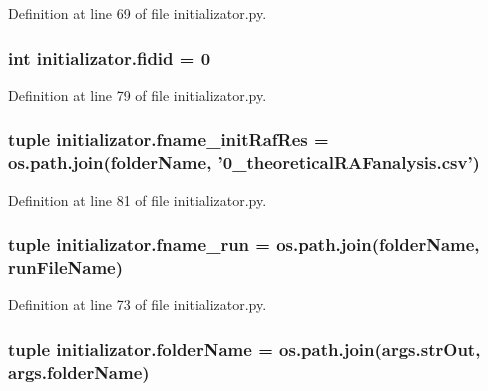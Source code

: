 Definition at line 69 of file initializator.\-py.

\hypertarget{a00135_afdd976dc87dc056c8cba6926f9f98287}{
\subsubsection[{fidid}]{\setlength{\rightskip}{0pt plus 5cm}int initializator.\-fidid = 0}}\label{a00135_afdd976dc87dc056c8cba6926f9f98287}


Definition at line 79 of file initializator.\-py.

\hypertarget{a00135_a139a15a6b4127dd23049cb2b91a85d77}{
\subsubsection[{fname\-\_\-init\-Raf\-Res}]{\setlength{\rightskip}{0pt plus 5cm}tuple initializator.\-fname\-\_\-init\-Raf\-Res = os.\-path.\-join({\bf folder\-Name}, '0\-\_\-theoretical\-R\-A\-Fanalysis.\-csv')}}\label{a00135_a139a15a6b4127dd23049cb2b91a85d77}


Definition at line 81 of file initializator.\-py.

\hypertarget{a00135_a6bc5100ec1c6492cec974172df243857}{
\subsubsection[{fname\-\_\-run}]{\setlength{\rightskip}{0pt plus 5cm}tuple initializator.\-fname\-\_\-run = os.\-path.\-join({\bf folder\-Name}, {\bf run\-File\-Name})}}\label{a00135_a6bc5100ec1c6492cec974172df243857}


Definition at line 73 of file initializator.\-py.

\hypertarget{a00135_aa51c106700ef9afbdb94a1c800e10569}{
\subsubsection[{folder\-Name}]{\setlength{\rightskip}{0pt plus 5cm}tuple initializator.\-folder\-Name = os.\-path.\-join(args.\-str\-Out, args.\-folder\-Name)}}\label{a00135_aa51c106700ef9afbdb94a1c800e10569}



